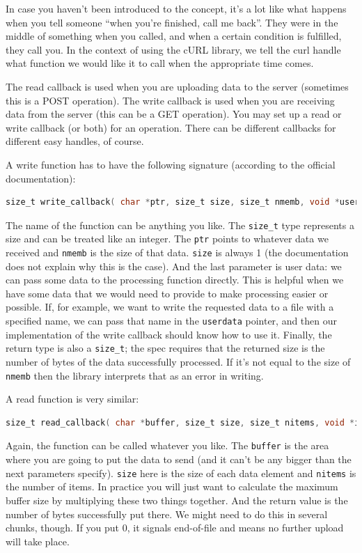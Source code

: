 \documentclass[a4paper]{report}
\begin{document}
In case you haven't been introduced to the concept, it's a lot like what happens when you tell someone ``when you're finished, call me back''. They were in the middle of something when you called, and when a certain condition is fulfilled, they call you. In the context of using the cURL library, we tell the curl handle what function we would like it to call when the appropriate time comes.

The read callback is used when you are uploading data to the server (sometimes this is a POST operation). The write callback is used when you are receiving data from the server (this can be a GET operation). You may set up a read or write callback (or both) for an operation. There can be different callbacks for different easy handles, of course.

A write function has to have the following signature (according to the official documentation):
\begin{lstlisting}[language=C]
size_t write_callback( char *ptr, size_t size, size_t nmemb, void *userdata );
\end{lstlisting}

The name of the function can be anything you like. The \texttt{size\_t} type represents a size and can be treated like an integer. The \texttt{ptr} points to whatever data we received and \texttt{nmemb} is the size of that data. \texttt{size} is always 1 (the documentation does not explain why this is the case). And the last parameter is user data: we can pass some data to the processing function directly. This is helpful when we have some data that we would need to provide to make processing easier or possible. If, for example, we want to write the requested data to a file with a specified name, we can pass that name in the \texttt{userdata} pointer, and then our implementation of the write callback should know how to use it. Finally, the return type is also a \texttt{size\_t}; the spec requires that the returned size is the number of bytes of the data successfully processed. If it's not equal to the size of \texttt{nmemb} then the library interprets that as an error in writing.

A read function is very similar:
\begin{lstlisting}[language=C]
size_t read_callback( char *buffer, size_t size, size_t nitems, void *inputdata );
\end{lstlisting}
Again, the function can be called whatever you like. The \texttt{buffer} is the area where you are going to put the data to send (and it can't be any bigger than the next parameters specify). \texttt{size} here is the size of each data element and \texttt{nitems} is the number of items. In practice you will just want to calculate the maximum buffer size by multiplying these two things together. And the return value is the number of bytes successfully put there. We might need to do this in several chunks, though. If you put 0, it signals end-of-file and means no further upload will take place.
\end{document}
